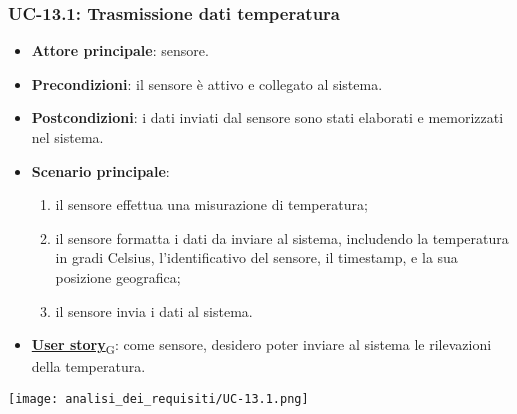 \subsubsection{UC-13.1: Trasmissione dati temperatura}
\begin{itemize}
	\item \textbf{Attore principale}: sensore.
	\item \textbf{Precondizioni}: il sensore è attivo e collegato al sistema.
	\item \textbf{Postcondizioni}: i dati inviati dal sensore sono stati elaborati e memorizzati nel sistema.
	\item \textbf{Scenario principale}:
	      \begin{enumerate}
		      \item il sensore effettua una misurazione di temperatura;
		      \item il sensore formatta i dati da inviare al sistema, includendo la temperatura in gradi Celsius, l'identificativo del sensore,
		            il timestamp, e la sua posizione geografica;
		      \item il sensore invia i dati al sistema.
	      \end{enumerate}
	\item \href{https://7last.github.io/docs/rtb/documentazione-interna/glossario\#user-story}{\textbf{User story}\textsubscript{G}}: come sensore, desidero poter inviare al sistema le rilevazioni della temperatura.
\end{itemize}

\begin{center}
	\texttt{[image: analisi\_dei\_requisiti/UC-13.1.png]}
\end{center}

